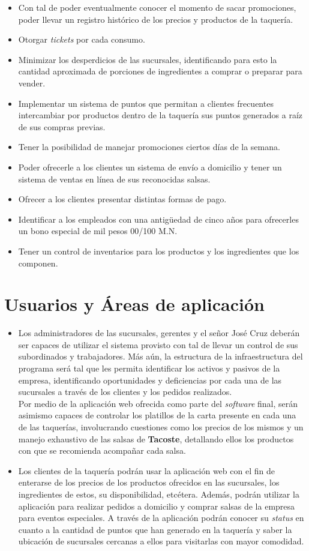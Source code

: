 \documentclass[11pt,letterpaper]{article}
\begin{document}
\begin{itemize}
\item Con tal de poder eventualmente conocer el momento de sacar promociones, poder llevar un registro histórico de los precios y productos de la taquería. 
\item Otorgar \textit{tickets} por cada consumo.
\item Minimizar los desperdicios de las sucursales, identificando para esto la cantidad aproximada de porciones de ingredientes a comprar o preparar para vender.
\item Implementar un sistema de puntos que permitan a clientes frecuentes intercambiar por productos dentro de la taquería sus puntos generados a raíz de sus compras previas.
\item Tener la posibilidad de manejar promociones ciertos días de la semana. 
\item Poder ofrecerle a los clientes un sistema de envío a domicilio y tener un sistema de ventas en línea de sus reconocidas salsas.
\item Ofrecer a los clientes presentar distintas formas de pago.
\item Identificar a los empleados con una antigüedad de cinco años para ofrecerles un bono especial de mil pesos 00/100 M.N.
\item Tener un control de inventarios para los productos y los ingredientes que los componen.
\end{itemize} 
\section{Usuarios y Áreas de aplicación}


\begin{itemize}
\item Los administradores de las sucursales, gerentes y el señor José Cruz deberán ser capaces de utilizar el sistema provisto con tal de llevar un control de sus subordinados y trabajadores. Más aún, la estructura de la infraestructura del programa será tal que les permita identificar los activos y pasivos de la empresa, identificando oportunidades y deficiencias por cada una de las sucursales a través de los clientes y los pedidos realizados. \\

Por medio de la aplicación web ofrecida como parte del \textit{software} final, serán asimismo capaces de controlar los platillos de la carta presente en cada una de las taquerías, involucrando cuestiones como los precios de los mismos y un manejo exhaustivo de las salsas de \textbf{Tacoste}, detallando ellos los productos con que se recomienda acompañar cada salsa.
\item Los clientes de la taquería podrán usar la aplicación web con el fin de enterarse de los precios de los productos ofrecidos en las sucursales, los ingredientes de estos, su disponibilidad, etcétera. Además, podrán utilizar la aplicación para realizar pedidos a domicilio y comprar salsas de la empresa para eventos especiales. A través de la aplicación podrán conocer su \textit{status} en cuanto a la cantidad de puntos que han generado en la taquería y saber la ubicación de sucursales cercanas a ellos para visitarlas con mayor comodidad.
\end{itemize}
\end{document}
